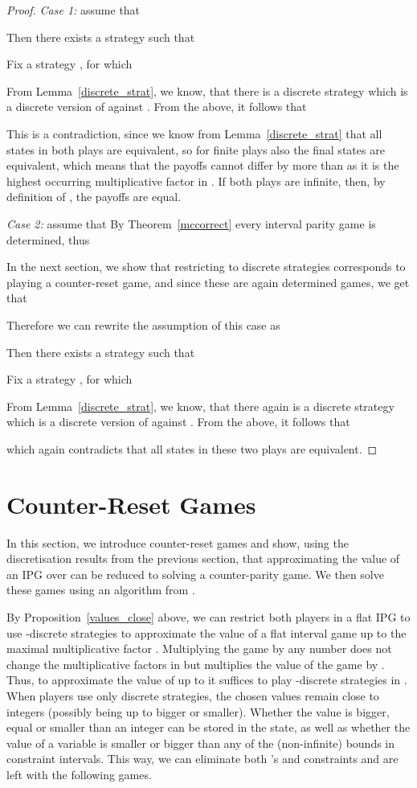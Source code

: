 \documentclass[fleqn,envcountsame]{LMCS}
\begin{document}
\begin{proof}
\emph{Case 1:} assume that

Then there exists a strategy
 such that 
 
Fix a strategy , for which 
 
From Lemma~\ref{discrete_strat}, we know, that there is a discrete
strategy  which is a discrete version
of  against . From the above, it follows that 
 
This is a contradiction, since we know from Lemma~\ref{discrete_strat} that
all states in both plays are equivalent, so for finite plays also the final
states are equivalent, which means that the payoffs cannot differ by more
than  as it is the highest occurring multiplicative factor in . If
both plays are infinite, then, by definition of , the payoffs are equal.

\emph{Case 2:} assume that  
By Theorem~\ref{mccorrect} every interval parity game is determined, thus

In the next section, we show that restricting to discrete strategies
corresponds to playing a counter-reset game, and since these are again
determined games, we get that

Therefore we can rewrite the assumption of this case as

Then there exists a strategy  such that 
 
Fix a strategy , for which 

From Lemma~\ref{discrete_strat}, we know, that there again is a discrete
strategy  which is a discrete version
of  against . From the above, it follows that 

which again contradicts that all states in these two plays are equivalent.
\end{proof}


\section{Counter-Reset Games} \label{sec_pushdown}

In this section, we introduce counter-reset games and show,
using the discretisation results from the previous section, 
that approximating the value of an IPG over  can be
reduced to solving a counter-parity game. We then solve these
games using an algorithm from \cite{BKL12}.

By Proposition~\ref{values_close} above, we can restrict both players
in a flat IPG to use -discrete strategies to approximate the value
of a flat interval game up to the maximal multiplicative factor .
Multiplying the game by any number  does not change the
multiplicative factors in  but multiplies the value
of the game by . Thus, to approximate the value of 
up to  it suffices to play -discrete
strategies in . When players use only
discrete strategies, the chosen values remain close to integers
(possibly being up to  bigger or smaller).
Whether the value is bigger, equal or smaller than an integer
can be stored in the state, as well as whether the value of
a variable is smaller or bigger than any of the (non-infinite) bounds
in constraint intervals. This way, we can eliminate both 's
and constraints and are left with the following games.
\end{document}
